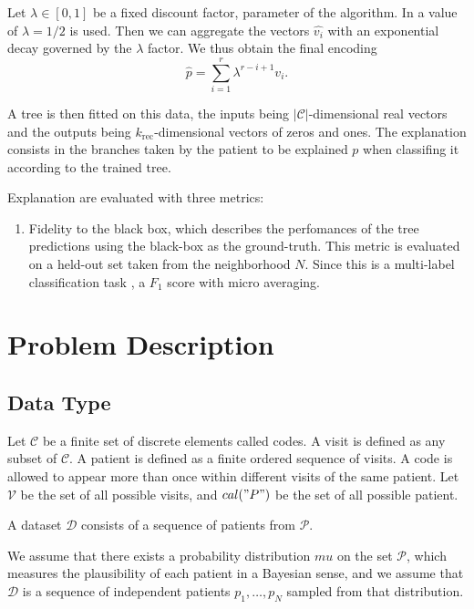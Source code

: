 \documentclass[]{marticle}
\newcommand{\ds}{\mathcal{D}}
\newcommand{\codes}{\mathcal{C}}
\newcommand{\patients}{\mathcal{P}}
\newcommand{\visits}{\mathcal{V}}
\begin{document}
Let $\lambda\in [0,1]$ be a fixed discount factor, parameter of the algorithm. In
\cite{panigutti-xai} a value of $\lambda = 1/2$ is used. Then we can aggregate the vectors
$\hat{v_i}$ with an exponential decay governed by the $\lambda$ factor. We thus obtain the final
encoding
\begin{equation*}
    \hat{p} = \sum_{i=1}^r \lambda^{r-i+1} v_i.
\end{equation*}

A tree is then fitted on this data, the inputs being $|\codes|$-dimensional real vectors and the
outputs being $k_\text{rec}$-dimensional vectors of zeros and ones. The explanation consists in the
branches taken by the patient to be explained $p$ when classifing it according to the trained tree.

Explanation are evaluated with three metrics:
\begin{enumerate}
\item Fidelity to the black box, which describes the perfomances of the tree predictions using the
black-box as the ground-truth. This metric is evaluated on a held-out set taken from the
neighborhood $N$. Since this is a multi-label classification task \cite{paper-multi-label}, a $F_1$
score with micro averaging.


\end{enumerate}

\section{Problem Description}

\subsection{Data Type}

Let $\codes$ be a finite set of discrete elements called codes. A visit is defined as any subset
of $\codes$. A patient is defined as a finite ordered sequence of visits. A code is allowed to
appear more than once within different visits of the same patient. Let $\visits$ be the set of all
possible visits, and $cal("P")$ be the set of all possible patient.

A dataset $\ds$ consists of a sequence of patients from $\patients$.

We assume that there exists a probability distribution $mu$ on the set $\patients$, which measures
the plausibility of each patient in a Bayesian sense, and we assume that $\ds$ is a sequence of
independent patients $p_1, \dots, p_N$ sampled from that distribution.
\end{document}
